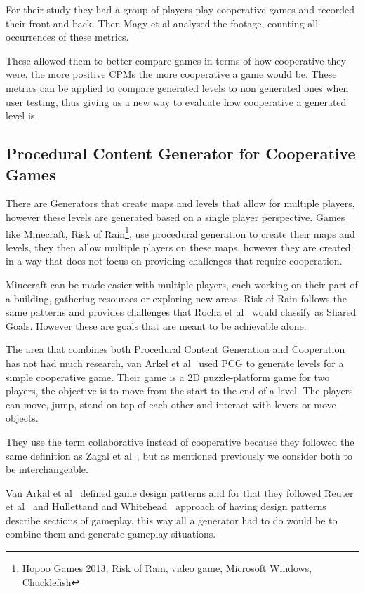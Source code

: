 \documentclass[runningheads]{llncs}
\begin{document}
For their study they had a group of players play cooperative games and recorded their front and back. Then Magy et al analysed the footage, counting all occurrences of these metrics.

These allowed them to better compare games in terms of how cooperative they were, the more positive CPMs the more cooperative a game would be. These metrics can be applied to compare generated levels to non generated ones when user testing, thus giving us a new way to evaluate how cooperative a generated level is.

\subsection{Procedural Content Generator for Cooperative Games}

There are Generators that create maps and levels that allow for multiple players, however these levels are generated based on a single player perspective. Games like Minecraft, Risk of Rain\footnote{Hopoo Games 2013, Risk of Rain, video game, Microsoft Windows, Chucklefish}, use procedural generation to create their maps and levels, they then allow multiple players on these maps, however they are created in a way that does not focus on providing challenges that require cooperation.

Minecraft can be made easier with multiple players, each working on their part of a building, gathering resources or exploring new areas. Risk of Rain follows the same patterns and provides challenges that Rocha et al~\cite{ref_rocha} would classify as Shared Goals. However these are goals that are meant to be achievable alone.

The area that combines both Procedural Content Generation and Cooperation has not had much research, van Arkel et al~\cite{ref_arkel} used PCG to generate levels for a simple cooperative game. Their game is a 2D puzzle-platform game for two players, the objective is to move from the start to the end of a level. The players can move, jump, stand on top of each other and interact with levers or move objects.

They use the term collaborative instead of cooperative because they followed the same definition as Zagal et al~\cite{ref_zagal}, but as mentioned previously we consider both to be interchangeable. 

Van Arkal et al~\cite{ref_arkel} defined game design patterns and for that they followed Reuter et al~\cite{ref_reuter} and Hullettand and Whitehead~\cite{ref_whitehead} approach of having design patterns describe sections of gameplay, this way all a generator had to do would be to combine them and generate gameplay situations.
\end{document}
